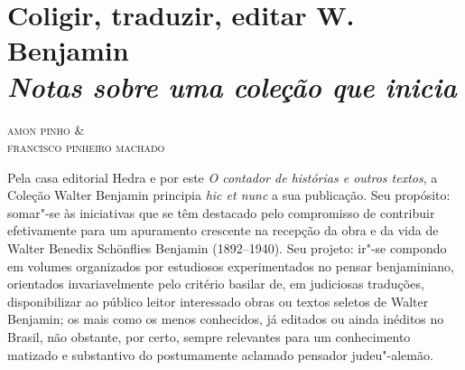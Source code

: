 \chapter*{Coligir, traduzir, editar W. Benjamin\\ \textit{Notas sobre uma coleção que inicia}}


\begin{flushright}
\hfill\scshape{amon pinho \& \\
francisco pinheiro machado}\smallskip
\end{flushright}

\noindent Pela casa editorial Hedra e por este \emph{O contador de histórias e outros textos}, a Coleção Walter Benjamin principia \emph{hic et nunc} 
a sua publicação. Seu propósito: somar"-se às iniciativas que se
têm destacado pelo compromisso de contribuir efetivamente para um
apuramento crescente na recepção da obra e da vida de Walter Benedix
Schönflies Benjamin (1892--1940). Seu projeto: ir"-se compondo em volumes
organizados por estudiosos experimentados no pensar benjaminiano,
orientados invariavelmente pelo critério basilar de, em judiciosas
traduções, disponibilizar ao público leitor interessado obras ou textos
seletos de Walter Benjamin; os mais como os menos conhecidos, já
editados ou ainda inéditos no Brasil, não obstante, por certo, sempre
relevantes para um conhecimento matizado e substantivo do postumamente
aclamado pensador judeu"-alemão.

